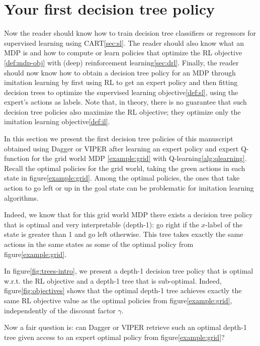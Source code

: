 \section{Your first decision tree policy}\label{sec:limits-il}
Now the reader should know how to train decision tree classifiers or regressors for supervised learning using CART\ref{sec:sl}.
The reader should also know what an MDP is and how to compute or learn policies that optimize the RL objective \ref{def:mdp-obj} with (deep) reinforcement learning\ref{sec:drl}.
Finally, the reader should now know how to obtain a decision tree policy for an MDP through imitation learning by first using RL to get an expert policy and then fitting decision trees to optimize the supervised learning objective\ref{def:sl}, using the expert's actions as labels.
Note that, in theory, there is no guarantee that such decision tree policies also maximize the RL objective; they optimize only the imitation learning objective\ref{def:il}.

In this section we present the first decision tree policies of this manuscript obtained using Dagger or VIPER after learning an expert policy and expert Q-function for the grid world MDP \ref{example:grid} with Q-learning\ref{alg:qlearning}.
Recall the optimal policies for the grid world, taking the green actions in each state in figure\ref{example:grid}. 
Among the optimal policies, the ones that take action to go left or up in the goal state can be problematic for imitation learning algorithms.

Indeed, we know that for this grid world MDP there exists a decision tree policy that is optimal and very interpretable (depth-1): go right if the $x$-label of the state is greater than 1 and go left otherwise.
This tree takes exactly the same actions in the same states as some of the optimal policy from figure\ref{example:grid}.

In figure\ref{fig:trees-intro}, we present a depth-1 decision tree policy that is optimal w.r.t. the RL objective and a depth-1 tree that is sub-optimal.
Indeed, figure\ref{fig:objectives} shows that the optimal depth-1 tree achieves exactly the same RL objective value as the optimal policies from figure\ref{example:grid}, independently of the discount factor $\gamma$.

Now a fair question is: can Dagger or VIPER retrieve such an optimal depth-1 tree given access to an expert optimal policy from figure\ref{example:grid}?

